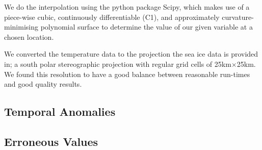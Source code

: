 \documentclass[../main.tex]{subfiles}
\begin{document}
We do the interpolation using the python package Scipy, which makes use of a piece-wise cubic, continuously differentiable (C1), and approximately curvature-minimising polynomial surface to determine the value of our given variable at a chosen location. 

We converted the temperature data to the projection the sea ice data is provided in; a south polar stereographic projection with regular grid cells of 25km$\times$25km. We found this resolution to have a good balance between reasonable run-times and good quality results.

\subsection*{Temporal Anomalies}
\subsection*{Erroneous Values}
\end{document}
